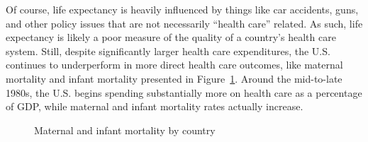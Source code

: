\documentclass[
  letterpaper,
  DIV=11,
  numbers=noendperiod]{scrreport}
\theoremstyle{definition}
\theoremstyle{remark}
\begin{document}

Of course, life expectancy is heavily influenced by things like car
accidents, guns, and other policy issues that are not necessarily
``health care'' related. As such, life expectancy is likely a poor
measure of the quality of a country's health care system. Still, despite
significantly larger health care expenditures, the U.S. continues to
underperform in more direct health care outcomes, like maternal
mortality and infant mortality presented in Figure~\ref{fig-mort}.
Around the mid-to-late 1980s, the U.S. begins spending substantially
more on health care as a percentage of GDP, while maternal and infant
mortality rates actually increase.

\begin{figure}

\begin{minipage}[t]{0.50\linewidth}

{\centering 


}

\end{minipage}%
%
\begin{minipage}[t]{0.50\linewidth}

{\centering 


}

\end{minipage}%

\caption{\label{fig-mort}Maternal and infant mortality by country}

\end{figure}
\end{document}
